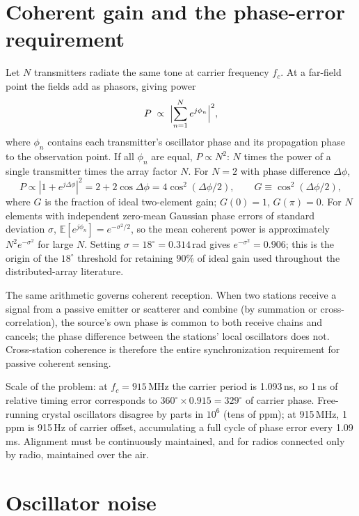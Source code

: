 \documentclass[10pt]{article}
\newcommand{\E}{\mathbb{E}}
\begin{document}
\section{Coherent gain and the phase-error requirement}
\label{sec:gain}
Let $N$ transmitters radiate the same tone at carrier frequency $f_c$.
At a far-field point the fields add as phasors, giving power
\begin{equation}
P \;\propto\; \Bigl|\sum_{n=1}^{N} e^{j\phi_n}\Bigr|^2 ,
\end{equation}
where $\phi_n$ contains each transmitter's oscillator phase and its
propagation phase to the observation point. If all $\phi_n$ are equal, $P
\propto N^2$: $N$ times the power of a single transmitter times the array
factor $N$. For $N=2$ with phase difference $\Delta\phi$,
\begin{equation}
P \propto |1+e^{j\Delta\phi}|^2 = 2+2\cos\Delta\phi = 4\cos^2(\Delta\phi/2),
\qquad G \equiv \cos^2(\Delta\phi/2),
\label{eq:gain2}
\end{equation}
where $G$ is the fraction of ideal two-element gain; $G(0)=1$,
$G(\pi)=0$. For $N$ elements with independent zero-mean Gaussian phase
errors of standard deviation $\sigma$, $\E[e^{j\phi_n}]=e^{-\sigma^2/2}$,
so the mean coherent power is approximately $N^2e^{-\sigma^2}$ for large
$N$. Setting $\sigma=18^\circ=0.314$\,rad gives $e^{-\sigma^2}=0.906$;
this is the origin of the $18^\circ$ threshold for retaining $90\%$ of
ideal gain used throughout the distributed-array literature.

The same arithmetic governs coherent reception. When two stations receive
a signal from a passive emitter or scatterer and combine (by summation or
cross-correlation), the source's own phase is common to both receive
chains and cancels; the phase difference between the stations' local
oscillators does not. Cross-station coherence is therefore the entire
synchronization requirement for passive coherent sensing.

Scale of the problem: at $f_c=915$\,MHz the carrier period is 1.093\,ns,
so 1\,ns of relative timing error corresponds to
$360^\circ\times0.915=329^\circ$ of carrier phase. Free-running crystal
oscillators disagree by parts in $10^{6}$ (tens of ppm); at 915\,MHz,
1\,ppm is 915\,Hz of carrier offset, accumulating a full cycle of phase
error every 1.09\,ms. Alignment must be continuously maintained, and for
radios connected only by radio, maintained over the air.

\section{Oscillator noise}
\label{sec:osc}
\end{document}
